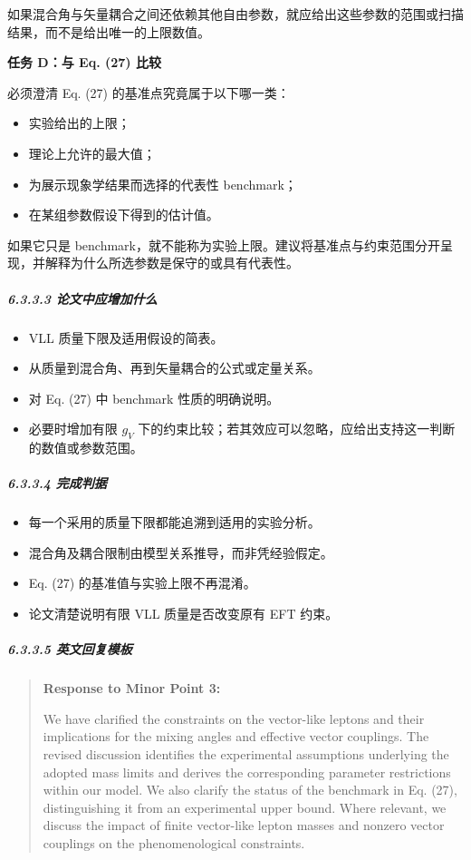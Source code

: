\documentclass[
  chinese,
  UTF8]{ctexart}
\providecommand{\tightlist}{%
  \setlength{\itemsep}{0pt}\setlength{\parskip}{0pt}}
\begin{document}
如果混合角与矢量耦合之间还依赖其他自由参数，就应给出这些参数的范围或扫描结果，而不是给出唯一的上限数值。

\textbf{任务 D：与 Eq. (27) 比较}

必须澄清 Eq. (27) 的基准点究竟属于以下哪一类：

\begin{itemize}
\tightlist
\item
  实验给出的上限；
\item
  理论上允许的最大值；
\item
  为展示现象学结果而选择的代表性 benchmark；
\item
  在某组参数假设下得到的估计值。
\end{itemize}

如果它只是
benchmark，就不能称为实验上限。建议将基准点与约束范围分开呈现，并解释为什么所选参数是保守的或具有代表性。

\subparagraph{6.3.3.3
论文中应增加什么}\label{ux8bbaux6587ux4e2dux5e94ux589eux52a0ux4ec0ux4e48-2}

\begin{itemize}
\tightlist
\item
  VLL 质量下限及适用假设的简表。
\item
  从质量到混合角、再到矢量耦合的公式或定量关系。
\item
  对 Eq. (27) 中 benchmark 性质的明确说明。
\item
  必要时增加有限 \(g_V\)
  下的约束比较；若其效应可以忽略，应给出支持这一判断的数值或参数范围。
\end{itemize}

\subparagraph{6.3.3.4 完成判据}\label{ux5b8cux6210ux5224ux636e-2}

\begin{itemize}
\tightlist
\item
  每一个采用的质量下限都能追溯到适用的实验分析。
\item
  混合角及耦合限制由模型关系推导，而非凭经验假定。
\item
  Eq. (27) 的基准值与实验上限不再混淆。
\item
  论文清楚说明有限 VLL 质量是否改变原有 EFT 约束。
\end{itemize}

\subparagraph{6.3.3.5
英文回复模板}\label{ux82f1ux6587ux56deux590dux6a21ux677f-2}

\begin{quote}
\textbf{Response to Minor Point 3:}

We have clarified the constraints on the vector-like leptons and their
implications for the mixing angles and effective vector couplings. The
revised discussion identifies the experimental assumptions underlying
the adopted mass limits and derives the corresponding parameter
restrictions within our model. We also clarify the status of the
benchmark in Eq. (27), distinguishing it from an experimental upper
bound. Where relevant, we discuss the impact of finite vector-like
lepton masses and nonzero vector couplings on the phenomenological
constraints.
\end{quote}
\end{document}
